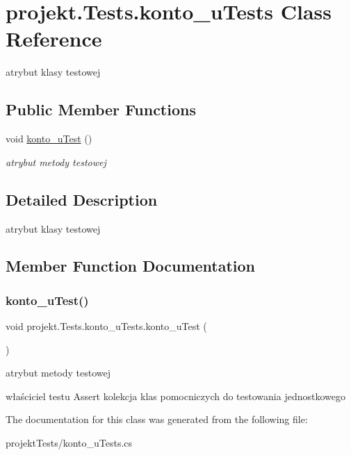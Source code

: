 \hypertarget{classprojekt_1_1_tests_1_1konto__u_tests}{}\section{projekt.\+Tests.\+konto\+\_\+u\+Tests Class Reference}
\label{classprojekt_1_1_tests_1_1konto__u_tests}


atrybut klasy testowej  


\subsection*{Public Member Functions}
\begin{DoxyCompactItemize}
\item 
void \mbox{\hyperlink{classprojekt_1_1_tests_1_1konto__u_tests_ad491d7f3814cd065f32ce29087e43e98}{konto\+\_\+u\+Test}} ()
\begin{DoxyCompactList}\small\item\em atrybut metody testowej \end{DoxyCompactList}\end{DoxyCompactItemize}


\subsection{Detailed Description}
atrybut klasy testowej 

\subsection{Member Function Documentation}
\mbox{\label{classprojekt_1_1_tests_1_1konto__u_tests_ad491d7f3814cd065f32ce29087e43e98}} 
\subsubsection{\texorpdfstring{konto\+\_\+u\+Test()}{konto\_uTest()}}
{\footnotesize\ttfamily void projekt.\+Tests.\+konto\+\_\+u\+Tests.\+konto\+\_\+u\+Test (\begin{DoxyParamCaption}{ }\end{DoxyParamCaption})\hspace{0.3cm}{\ttfamily [inline]}}



atrybut metody testowej 

właściciel testu Assert kolekcja klas pomocniczych do testowania jednostkowego 

The documentation for this class was generated from the following file\+:\begin{DoxyCompactItemize}
\item 
projekt\+Tests/konto\+\_\+u\+Tests.\+cs\end{DoxyCompactItemize}
